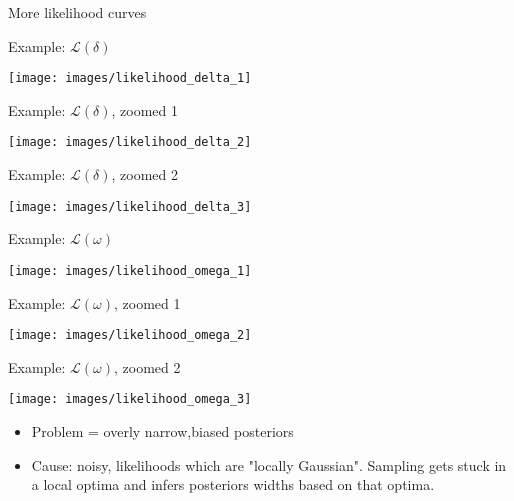 \documentclass[10pt]{beamer}
\begin{document}
\begin{frame}{More likelihood curves}
	
	Example: $\mathcal{L}(\delta)$
	
\texttt{[image: images/likelihood\_delta\_1]}
	
	
\end{frame}

\begin{frame}{}
	
	Example: $\mathcal{L}(\delta)$, zoomed 1
	
	\texttt{[image: images/likelihood\_delta\_2]}
	
	
\end{frame}


\begin{frame}{}
	
	Example: $\mathcal{L}(\delta)$, zoomed 2
	
	\texttt{[image: images/likelihood\_delta\_3]}
	
	
\end{frame}


\begin{frame}{}
	
	Example: $\mathcal{L}(\omega)$
	
	\texttt{[image: images/likelihood\_omega\_1]}

	
\end{frame}


\begin{frame}{}
	
	Example: $\mathcal{L}(\omega)$, zoomed 1
	
	\texttt{[image: images/likelihood\_omega\_2]}
	
	
\end{frame}


\begin{frame}{}
	
	Example: $\mathcal{L}(\omega)$, zoomed 2
	
	\texttt{[image: images/likelihood\_omega\_3]}
	
	
\end{frame}






\begin{frame}{}
	
		\begin{itemize}
		\item \alert{Problem} = overly narrow,biased posteriors
		\item Cause: noisy, likelihoods which are "locally Gaussian". Sampling gets stuck in a local optima and infers posteriors widths based on that optima. 

	\end{itemize}
	
	
	
\end{frame}
\end{document}
